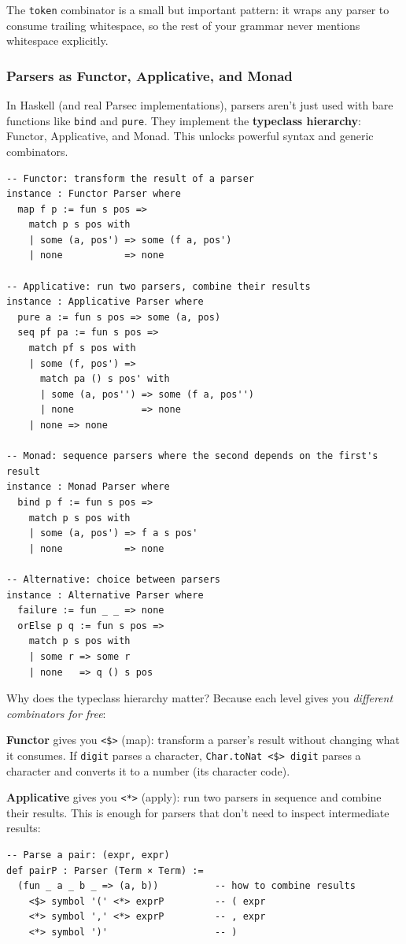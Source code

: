 \documentclass[11pt,a4paper]{article}
\theoremstyle{definition}
\begin{document}
The \texttt{token} combinator is a small but important pattern: it wraps
any parser to consume trailing whitespace, so the rest of your grammar never
mentions whitespace explicitly.

\subsubsection{Parsers as Functor, Applicative, and Monad}

In Haskell (and real Parsec implementations), parsers aren't just used with
bare functions like \texttt{bind} and \texttt{pure}. They implement the
\textbf{typeclass hierarchy}: Functor, Applicative, and Monad. This unlocks
powerful syntax and generic combinators.

\begin{verbatim}
-- Functor: transform the result of a parser
instance : Functor Parser where
  map f p := fun s pos =>
    match p s pos with
    | some (a, pos') => some (f a, pos')
    | none           => none

-- Applicative: run two parsers, combine their results
instance : Applicative Parser where
  pure a := fun s pos => some (a, pos)
  seq pf pa := fun s pos =>
    match pf s pos with
    | some (f, pos') =>
      match pa () s pos' with
      | some (a, pos'') => some (f a, pos'')
      | none            => none
    | none => none

-- Monad: sequence parsers where the second depends on the first's result
instance : Monad Parser where
  bind p f := fun s pos =>
    match p s pos with
    | some (a, pos') => f a s pos'
    | none           => none

-- Alternative: choice between parsers
instance : Alternative Parser where
  failure := fun _ _ => none
  orElse p q := fun s pos =>
    match p s pos with
    | some r => some r
    | none   => q () s pos
\end{verbatim}

Why does the typeclass hierarchy matter? Because each level gives you
\emph{different combinators for free}:

\textbf{Functor} gives you \texttt{<\$>} (map): transform a parser's result
without changing what it consumes. If \texttt{digit} parses a character,
\texttt{Char.toNat <\$> digit} parses a character and converts it to a number (its character code).

\textbf{Applicative} gives you \texttt{<*>} (apply): run two parsers in
sequence and combine their results. This is enough for parsers that don't need
to inspect intermediate results:
\begin{verbatim}
-- Parse a pair: (expr, expr)
def pairP : Parser (Term × Term) :=
  (fun _ a _ b _ => (a, b))          -- how to combine results
    <$> symbol '(' <*> exprP         -- ( expr
    <*> symbol ',' <*> exprP         -- , expr
    <*> symbol ')'                   -- )
\end{verbatim}
\end{document}
